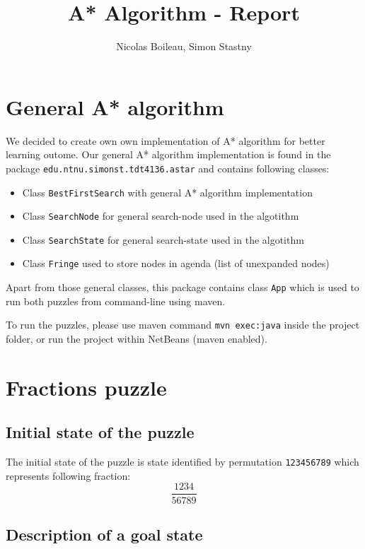 \documentclass{article}
\begin{document}
\title{A* Algorithm - Report}
\author{Nicolas Boileau, Simon Stastny}

\maketitle

\section{General A* algorithm}

We decided to create own own implementation of A* algorithm for better learning
outome. Our general A* algorithm implementation is found in the package
\texttt{edu.ntnu.simonst.tdt4136.astar} and contains following classes:

\begin{itemize}
  \item Class \texttt{BestFirstSearch} with general A* algorithm implementation
  \item Class \texttt{SearchNode} for general search-node used in the algotithm
  \item Class \texttt{SearchState} for general search-state used in the
  algotithm
  \item Class \texttt{Fringe} used to store nodes in agenda (list of unexpanded
  nodes)
\end{itemize} 

Apart from those general classes, this package contains class \texttt{App} which
is used to run both puzzles from command-line using maven.

To run the puzzles, please use maven command \texttt{mvn exec:java} inside the
project folder, or run the project within NetBeans (maven enabled).

\section{Fractions puzzle}

\subsection{Initial state of the puzzle}

The initial state of the puzzle is state identified by permutation
\texttt{123456789} which represents following fraction:
\[
 \frac{1234}{56789}
\]

\subsection{Description of a goal state} \label{fracgoal}
\end{document}
